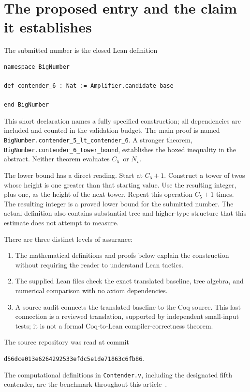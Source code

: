 \documentclass[11pt,letterpaper]{article}
\theoremstyle{definition}
\newcommand{\Cfive}{\ensuremath{C_5}}
\newcommand{\Cnew}{\ensuremath{N_\star}}
\newcommand{\code}[1]{\texttt{#1}}
\begin{document}
\tableofcontents
\newpage

\section{The proposed entry and the claim it establishes}

The submitted number is the closed Lean definition
\begin{Verbatim}[frame=single,fontsize=\small]
namespace BigNumber

def contender_6 : Nat := Amplifier.candidate base

end BigNumber
\end{Verbatim}
This short declaration names a fully specified construction; all dependencies
are included and counted in the validation budget. The main proof is named
\code{BigNumber.contender\_5\_lt\_contender\_6}. A stronger theorem,
\code{BigNumber.contender\_6\_tower\_bound}, establishes the boxed inequality
in the abstract. Neither theorem evaluates \Cfive\ or \Cnew.

The lower bound has a direct reading. Start at \(\Cfive+1\). Construct a tower
of twos whose height is one greater than that starting value. Use the resulting
integer, plus one, as the height of the next tower. Repeat this operation
\(\Cfive+1\) times. The resulting integer is a proved lower bound for the
submitted number. The actual definition also contains substantial tree and
higher-type structure that this estimate does not attempt to measure.

There are three distinct levels of assurance:
\begin{enumerate}
\item The mathematical definitions and proofs below explain the construction
      without requiring the reader to understand Lean tactics.
\item The supplied Lean files check the exact translated baseline, tree
      algebra, and numerical comparison with no axiom dependencies.
\item A source audit connects the translated baseline to the Coq source.
      This last connection is a reviewed translation, supported by independent
      small-input tests; it is not a formal Coq-to-Lean compiler-correctness
      theorem.
\end{enumerate}

The source repository was read at commit
\begin{center}
\code{d56dce013e6264292533efdc5e1de71863c6fb86}.
\end{center}
The computational definitions in \code{Contender.v}, including the designated
fifth contender, are the benchmark throughout this article~\cite{contender}.
\end{document}
